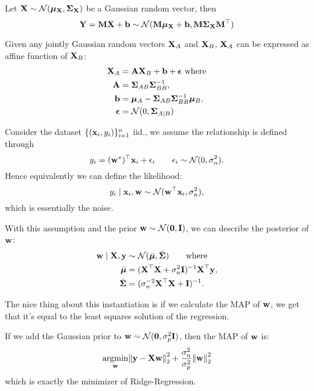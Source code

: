 

\begin{theorem*}
    Let \(\vb{X} \sim \operatorname{\mathcal{N}}(\vb*{\mu}_{\vb{X}}, \vb*{\Sigma}_{\vb{X}})\) be a Gaussian random vector, then
    \[\vb{Y} = \vb{M}\vb{X} + \vb{b} \sim \operatorname{\mathcal{N}}(\vb{M}\vb*{\mu}_{\vb{X}} + \vb{b}, \vb{M}\vb*{\Sigma}_{\vb{X}}\vb{M}^\top)\]
\end{theorem*}

\begin{theorem*}
    Given any jointly Gaussian random vectors \(\vb{X}_A\) and \(\vb{X}_B\), \(\vb{X}_A\) can be expressed as affine function of \(\vb{X}_B\):
    \begin{align*}
        \vb{X}_A &= \vb{A}\vb{X}_B + \vb{b} + \vb*{\epsilon} \ \text{where} \\
        \vb{A} &= \vb*{\Sigma}_{AB}\vb*{\Sigma}_{BB}^{-1}, \\
        \vb{b} &= \vb*{\mu}_A - \vb*{\Sigma}_{AB}\vb*{\Sigma}_{BB}^{-1}\vb*{\mu}_B, \\
        \vb*{\epsilon} &= \operatorname{\mathcal{N}}(0, \vb*{\Sigma}_{A \mid B})
    \end{align*}
\end{theorem*}

\begin{definition*}
    Consider the dataset \(\{(\vb{x}_i, y_i)\}_{i=1}^n\) iid., we assume the relationship is defined through
    \[y_i = (\vb{w}^{\ast})^\top \vb{x}_i + \epsilon_i \qquad \epsilon_i \sim \operatorname{\mathcal{N}}(0, \sigma_n^2).\]
    Hence equivalently we can define the likelihood:
    \[y_i \mid \vb{x}_i, \vb{w} \sim \operatorname{\mathcal{N}}(\vb{w}^\top\vb{x}_i, \sigma_n^2),\]
    which is essentially the noise.

    With this assumption and the prior \(\vb{w} \sim \operatorname{\mathcal{N}}(\vb{0}, \vb{I})\), we can describe the posterior of \(\vb{w}\):
    \begin{align*}
        \vb{w} \mid \vb{X}, \vb{y} &\sim \operatorname{\mathcal{N}}(\bar{\vb*{\mu}}, \bar{\vb*{\Sigma}}) \qquad \text{where} \\
        \bar{\vb*{\mu}} &= (\vb{X}^\top\vb{X} + \sigma_n^2 \vb{I})^{-1} \vb{X}^\top \vb{y}, \\
        \bar{\vb*{\Sigma}} &= (\sigma_n^{-2}\vb{X}^\top\vb{X} + \vb{I})^{-1}.
    \end{align*}

    The nice thing about this instantiation is if we calculate the MAP of \(\vb{w}\), we get that it's equal to the least squares solution of the regression.
\end{definition*}

\begin{definition*}
    If we add the Gaussian prior to \(\vb{w} \sim \operatorname{\mathcal{N}}(\vb{0}, \sigma_p^2 \vb{I})\), then the MAP of \(\vb{w}\) is:
    \[\underset{\vb{w}}{\text{argmin}} \norm{\vb{y} - \vb{X} \vb{w}}_2^2 + \frac{\sigma_n^2}{\sigma_p^2}\norm{\vb{w}}_2^2\]
    which is exactly the minimizer of Ridge-Regression.
\end{definition*}

